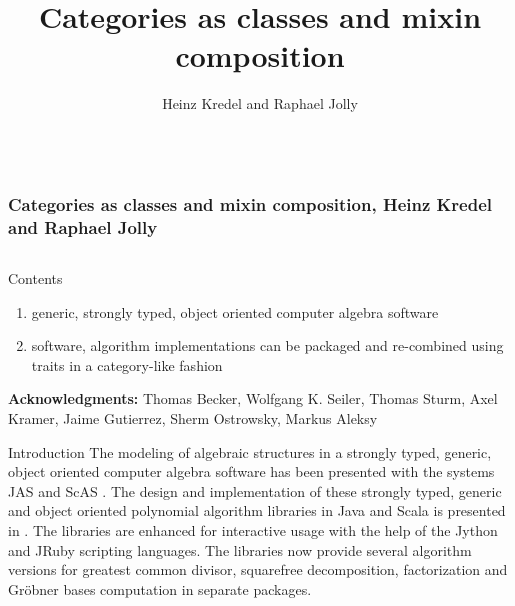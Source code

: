 \documentclass[final]{beamer}
\title[Categories and Mixins]{Categories as classes and mixin composition}
\author[Kredel \& Jolly]{Heinz Kredel\inst{1} and Raphael Jolly\inst{2}}
\institute{IT-Center, University of Mannheim, Germany %
\and Databeans, Paris, France%
}
\begin{document}

\begin{frame}[fragile] 
\frametitle{\mbox{ }\\ \hspace{13cm}Categories as classes and mixin composition, Heinz Kredel and Raphael Jolly}
\begin{columns}[t]

\begin{column}{.3\linewidth}

  \begin{block}{\large Contents}
  \normalsize 
  \begin{enumerate}
  \item generic, strongly typed, object oriented computer algebra software
  \item software, algorithm implementations can be packaged and
    re-combined using traits in a category-like fashion
  \end{enumerate}
\tiny
{\scriptsize \textbf{Acknowledgments:}}
Thomas Becker, Wolfgang K. Seiler, Thomas Sturm, Axel Kramer, 
Jaime Gutierrez, Sherm Ostrowsky, Markus Aleksy
  \end{block}
  \hfill
  \begin{block}{\large Introduction}
\scriptsize
The modeling of algebraic structures in a strongly typed, generic,
object oriented computer algebra software has been presented with the
systems JAS \cite{Kredel:2000,Kredel:2008} and ScAS \cite{Jolly:2010}.
The design and implementation of these strongly typed, generic and
object oriented polynomial algorithm libraries in Java and Scala is
presented in \cite{JollyKredel:2010}. %
The libraries are enhanced for interactive usage with the help of the Jython and
JRuby scripting languages. The libraries now
provide several algorithm versions for greatest common divisor,
squarefree decomposition, factorization and Gr\"obner bases
computation in separate packages.


\end{block}
\end{column}
\end{columns}
\end{frame}
\end{document}
